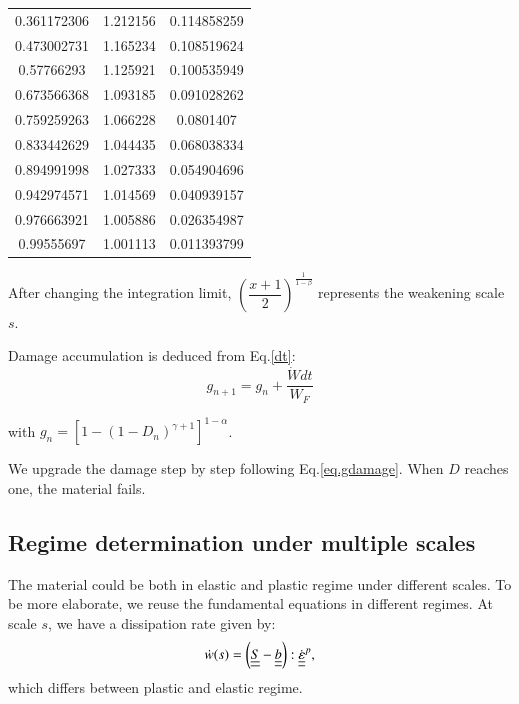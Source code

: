 \documentclass[3p,times,procedia,number]{elsarticle}
\begin{document}
\begin{table}[!h]
\begin{tabular}{ccc}
		0.361172306                      & 1.212156                 & 0.114858259                                   \\
		0.473002731                      & 1.165234                 & 0.108519624                                   \\
		0.57766293                       & 1.125921                 & 0.100535949                                   \\
		0.673566368                      & 1.093185                 & 0.091028262                                   \\
		0.759259263                      & 1.066228                 & 0.0801407                                     \\
		0.833442629                      & 1.044435                 & 0.068038334                                   \\
		0.894991998                      & 1.027333                 & 0.054904696                                   \\
		0.942974571                      & 1.014569                 & 0.040939157                                   \\
		0.976663921                      & 1.005886                 & 0.026354987                                   \\
		0.99555697                       & 1.001113                 & 0.011393799                                   \\ \hline
	\end{tabular}
\end{table}

After changing the integration limit, $\left( \dfrac{x+1}{2}\right) ^{\frac{1}{1-\beta}}$ represents the weakening scale $s$. 

Damage accumulation is deduced from Eq.\eqref{dt}:
\begin{equation}
	g_{n+1}=g_n+\dfrac{\dot{W}dt}{W_F}
	\label{eq.gdamage}
\end{equation}

with $g_n=\left[ 1-\left( 1-D_{n}\right)^{\gamma+1} \right]^{1-\alpha}$.

We upgrade the damage step by step following Eq.\eqref{eq.gdamage}. When $D$ reaches one, the material fails. 

\subsection{Regime determination under multiple scales}
The material could be both in elastic and plastic regime under different scales. To be more elaborate, we reuse the fundamental equations in different regimes. At scale $s$, we have a dissipation rate given by:
$$\dot{w}(s)=\left( \uline{\uline{S}}-\uline{\uline{b}}\right):\dot{\uline{\uline{\varepsilon}}}^p, $$
which differs between plastic and elastic regime.
\end{document}
